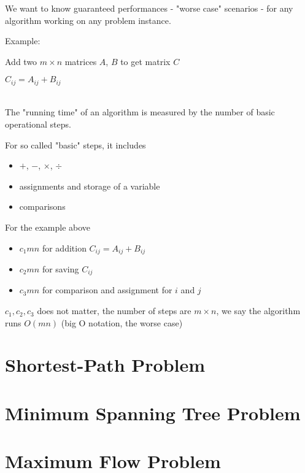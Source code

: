 			We want to know guaranteed performances - "worse case" scenarios -  for any algorithm working on any problem instance.

			Example: \\
			\begin{algorithm}[!ht]
				\caption{Add two $m \times n$ matrices $A$, $B$ to get matrix $C$}
				\begin{algorithmic}
							\STATE $C_{ij} = A_{ij} + B_{ij}$
						\ENDFOR
					\ENDFOR
				\end{algorithmic}				
			\end{algorithm}\\

			The "running time" of an algorithm is measured by the number of basic operational steps.

			For so called "basic" steps, it includes
			\begin{itemize}
				\item $+$, $-$, $\times$, $\div$
				\item assignments and storage of a variable
				\item comparisons
			\end{itemize}

			For the example above
			\begin{itemize}
				\item $c_1 m n$ for addition $C_{ij} = A_{ij} + B_{ij}$
				\item $c_2 m n$ for saving $C_{ij}$
				\item $c_3 m n$ for comparison and assignment for $i$ and $j$
			\end{itemize}
			$c_1, c_2, c_3$ does not matter, the number of steps are $m \times n$, we say the algorithm runs $O(mn)$ (big O notation, the worse case)

	\chapter{Shortest-Path Problem}

	\chapter{Minimum Spanning Tree Problem}

	\chapter{Maximum Flow Problem}

